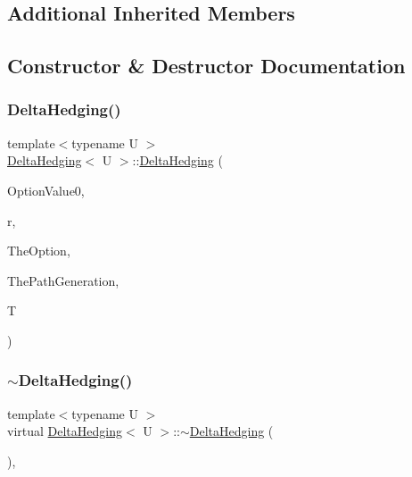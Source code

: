 \subsection*{Additional Inherited Members}


\subsection{Constructor \& Destructor Documentation}
\hypertarget{classDeltaHedging_ae1e5687d0d2c9ba019e58cd2433fe81d}{}\label{classDeltaHedging_ae1e5687d0d2c9ba019e58cd2433fe81d} 
\subsubsection{\texorpdfstring{Delta\+Hedging()}{DeltaHedging()}}
{\footnotesize\ttfamily template$<$typename U $>$ \\
\hyperlink{classDeltaHedging}{Delta\+Hedging}$<$ U $>$\+::\hyperlink{classDeltaHedging}{Delta\+Hedging} (\begin{DoxyParamCaption}\item[{double}]{Option\+Value0,  }\item[{double}]{r,  }\item[{shared\+\_\+ptr$<$ U $>$}]{The\+Option,  }\item[{\hyperlink{classPathGenerationGBM}{Path\+Generation\+G\+BM} $\ast$}]{The\+Path\+Generation,  }\item[{double}]{T }\end{DoxyParamCaption})}

\hypertarget{classDeltaHedging_a019b8bef20aaec88a6e1e7bacb8c0015}{}\label{classDeltaHedging_a019b8bef20aaec88a6e1e7bacb8c0015} 
\subsubsection{\texorpdfstring{$\sim$\+Delta\+Hedging()}{~DeltaHedging()}}
{\footnotesize\ttfamily template$<$typename U $>$ \\
virtual \hyperlink{classDeltaHedging}{Delta\+Hedging}$<$ U $>$\+::$\sim$\hyperlink{classDeltaHedging}{Delta\+Hedging} (\begin{DoxyParamCaption}{ }\end{DoxyParamCaption})\hspace{0.3cm}{\ttfamily [inline]}, {\ttfamily [virtual]}}



